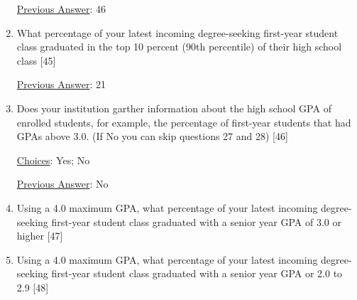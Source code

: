 \documentclass[12 pt, a4paper]{article}
\begin{document}
\begin{Form}
\begin{enumerate}
\underline{Previous Answer}: 46\medskip

\TextField[width = 6 in,multiline, name=90106]{} \medskip

\newpage

\item What percentage of your latest incoming degree-seeking first-year student class graduated in the top 10 percent (90th percentile) of their high school class [45] \medskip

\underline{Previous Answer}: 21\medskip

\TextField[width = 6 in,multiline, name=90107]{} \medskip

\item Does your institution garther information about the high school GPA of enrolled students, for example, the percentage of first-year students that had GPAs above 3.0. (If No you can skip questions 27 and 28) [46] \medskip

\underline{Choices}: Yes; No\medskip

\underline{Previous Answer}: No\medskip

\TextField[width = 6 in,multiline, name=90108]{} \medskip

\item Using a 4.0 maximum GPA, what percentage of your latest incoming degree-seeking first-year student class graduated with a senior year GPA of 3.0 or higher [47] \medskip

\TextField[width = 6 in,multiline, name=90109]{} \medskip

\item Using a 4.0 maximum GPA, what percentage of your latest incoming degree-seeking first-year student class graduated with a senior year GPA or 2.0 to 2.9 [48] \medskip

\TextField[width = 6 in,multiline, name=90110]{} \medskip

\end{enumerate}
\newpage
\end{Form}
\end{document}
